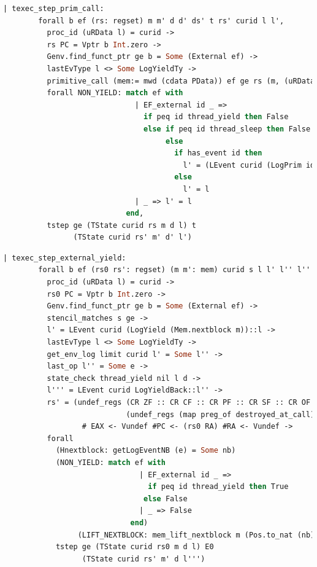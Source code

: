 \begin{lstlisting}[language=Caml]
    | texec_step_prim_call:
        forall b ef (rs: regset) m m' d d' ds' t rs' curid l l',
          proc_id (uRData l) = curid ->
          rs PC = Vptr b Int.zero ->
          Genv.find_funct_ptr ge b = Some (External ef) ->
          lastEvType l <> Some LogYieldTy ->
          primitive_call (mem:= mwd (cdata PData)) ef ge rs (m, (uRData l, d)) t rs' (m', (ds', d')) ->
          forall NON_YIELD: match ef with
                              | EF_external id _ => 
                                if peq id thread_yield then False
                                else if peq id thread_sleep then False
                                     else
                                       if has_event id then
                                         l' = (LEvent curid (LogPrim id nil 0 (snap_func d)) :: l)
                                       else
                                         l' = l
                              | _ => l' = l
                            end,
          tstep ge (TState curid rs m d l) t 
                (TState curid rs' m' d' l')
\end{lstlisting}

\begin{lstlisting}[language=Caml]
    | texec_step_external_yield:
        forall b ef (rs0 rs': regset) (m m': mem) curid s l l' l'' l''' nb d e,
          proc_id (uRData l) = curid ->
          rs0 PC = Vptr b Int.zero ->
          Genv.find_funct_ptr ge b = Some (External ef) ->
          stencil_matches s ge ->
          l' = LEvent curid (LogYield (Mem.nextblock m))::l ->
          lastEvType l <> Some LogYieldTy ->
          get_env_log limit curid l' = Some l'' ->
          last_op l'' = Some e ->
          state_check thread_yield nil l d ->
          l''' = LEvent curid LogYieldBack::l'' ->
          rs' = (undef_regs (CR ZF :: CR CF :: CR PF :: CR SF :: CR OF :: nil)
                            (undef_regs (map preg_of destroyed_at_call) rs0)) 
                  # EAX <- Vundef #PC <- (rs0 RA) #RA <- Vundef ->
          forall
            (Hnextblock: getLogEventNB (e) = Some nb)
            (NON_YIELD: match ef with
                               | EF_external id _ => 
                                 if peq id thread_yield then True
                                else False
                               | _ => False
                             end)
                 (LIFT_NEXTBLOCK: mem_lift_nextblock m (Pos.to_nat (nb) - Pos.to_nat(Mem.nextblock m) % nat) = m'),
            tstep ge (TState curid rs0 m d l) E0
                  (TState curid rs' m' d l''')
\end{lstlisting}

